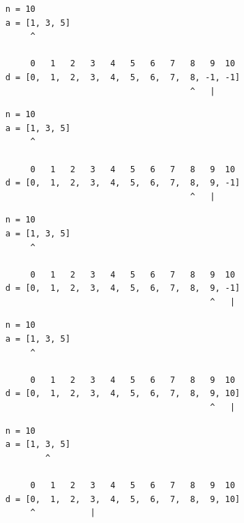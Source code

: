 \begin{frame}[fragile]
\begin{verbatim}
     n = 10
     a = [1, 3, 5]
          ^

          0   1   2   3   4   5   6   7   8   9  10
     d = [0,  1,  2,  3,  4,  5,  6,  7,  8, -1, -1]
                                          ^   |
\end{verbatim}
\end{frame}
\addtocounter{framenumber}{-1}

\begin{frame}[fragile]
\begin{verbatim}
     n = 10
     a = [1, 3, 5]
          ^

          0   1   2   3   4   5   6   7   8   9  10
     d = [0,  1,  2,  3,  4,  5,  6,  7,  8,  9, -1]
                                          ^   |
\end{verbatim}
\end{frame}
\addtocounter{framenumber}{-1}

\begin{frame}[fragile]
\begin{verbatim}
     n = 10
     a = [1, 3, 5]
          ^

          0   1   2   3   4   5   6   7   8   9  10
     d = [0,  1,  2,  3,  4,  5,  6,  7,  8,  9, -1]
                                              ^   |
\end{verbatim}
\end{frame}
\addtocounter{framenumber}{-1}

\begin{frame}[fragile]
\begin{verbatim}
     n = 10
     a = [1, 3, 5]
          ^

          0   1   2   3   4   5   6   7   8   9  10
     d = [0,  1,  2,  3,  4,  5,  6,  7,  8,  9, 10]
                                              ^   |
\end{verbatim}
\end{frame}
\addtocounter{framenumber}{-1}

\begin{frame}[fragile]
\begin{verbatim}
     n = 10
     a = [1, 3, 5]
             ^

          0   1   2   3   4   5   6   7   8   9  10
     d = [0,  1,  2,  3,  4,  5,  6,  7,  8,  9, 10]
          ^           |
\end{verbatim}
\end{frame}
\addtocounter{framenumber}{-1}

